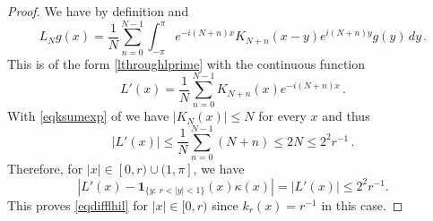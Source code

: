 \begin{proof}
We have by definition and 
\begin{equation}
    L_Ng(x)=
    \frac 1N\sum_{n=0}^{N-1}
       \int_{-\pi}^{\pi} e^{-i(N+n)x} K_{N+n}(x-y) e^{i(N+n)y}g(y)
\, dy \, .\end{equation}
This is of the form \eqref{lthroughlprime} with
the continuous function
\begin{equation}
    {L'}(x)= \frac 1N\sum_{n=0}^{N-1}
      K_{N+n}(x) e^{-i(N+n)x}\, .
\end{equation}
With \eqref{eqksumexp} of 
we have $|K_N(x)|\le N$ for every $x$ and thus
\begin{equation}\label{eqhil13}
    |{L'}(x)|\le \frac 1N\sum_{n=0}^{N-1}
      (N+n) \le 2N\le 2^2 r^{-1}\, .
\end{equation}
Therefore, for $|x|\in [0, r)\cup (1, \pi]$, we have
\begin{equation}
    \label{eqdiffzero}
    \left|L'(x)-\mathbf{1}_{\{y:\, r<|y|<1\}}(x)\kappa(x)\right|=|L'(x)|\leq 2^{2} r^{-1}.
\end{equation}
This proves \eqref{eqdifflhil} for $|x|\in [0, r)$ since $k_r(x)=r^{-1}$ in this case.


\end{proof}
